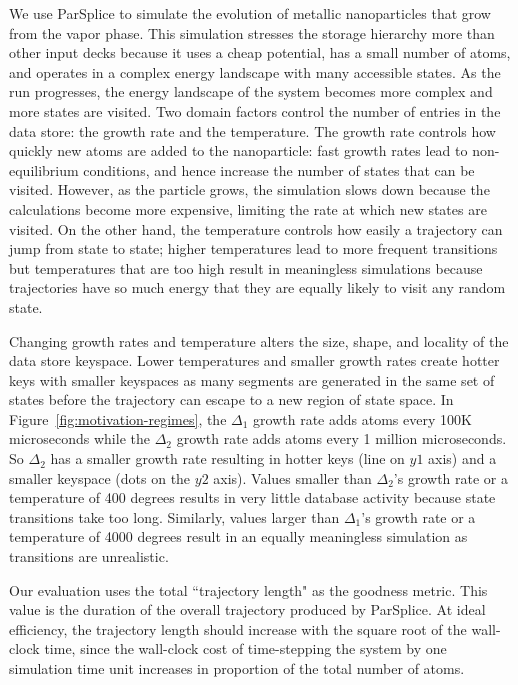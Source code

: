 We use ParSplice to simulate the evolution of metallic nanoparticles that grow
from the vapor phase.  This simulation stresses the storage hierarchy more than
other input decks because it uses a cheap potential, has a small number of
atoms, and operates in a complex energy landscape with many accessible states.
As the run progresses, the energy landscape of the system becomes more complex
and more states are visited.  Two domain factors control the number of entries
in the data store: the growth rate and the temperature. The growth rate
controls how quickly new atoms are added to the nanoparticle: fast growth rates
lead to non-equilibrium conditions, and hence increase the number of states
that can be visited.  However, as the particle grows, the simulation slows down
because the calculations become more expensive, limiting the rate at which new
states are visited.  On the other hand, the temperature controls how easily a
trajectory can jump from state to state; higher temperatures lead to more
frequent transitions but temperatures that are too high result in meaningless
simulations because trajectories have so much energy that they are equally
likely to visit any random state. 

Changing growth rates and temperature alters the size, shape, and locality of
the data store keyspace. Lower temperatures and smaller growth rates create
hotter keys with smaller keyspaces as many segments are generated in the same
set of states before the trajectory can escape to a new region of state space.
In Figure~\ref{fig:motivation-regimes}, the \(\Delta_1\) growth rate adds atoms
every 100K microseconds while the \(\Delta_2\) growth rate adds atoms every 1
million microseconds. So \(\Delta_2\) has a smaller growth rate resulting in
hotter keys (line on \(y1\) axis) and a smaller keyspace (dots on the \(y2\)
axis).  Values smaller than \(\Delta_2\)'s growth rate or a temperature of 400
degrees results in very little database activity because state transitions take
too long. Similarly, values larger than \(\Delta_1\)'s growth rate or a
temperature of 4000 degrees result in an equally meaningless simulation as
transitions are unrealistic.

Our evaluation uses the total ``trajectory length" as the goodness metric. This
value is the duration of the overall trajectory produced by ParSplice. At
ideal efficiency, the trajectory length should increase with the square root of
the wall-clock time, since the wall-clock cost of time-stepping the system by
one simulation time unit increases in proportion of the total number of atoms.

